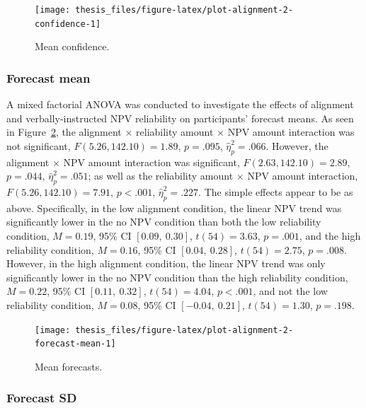 \documentclass[a4paper, nobind, dvipsnames]{templates/ociamthesis}
\theoremstyle{definition}
\theoremstyle{definition}
\theoremstyle{definition}
\theoremstyle{definition}
\theoremstyle{remark}
\begin{document}
\begin{figure}
\texttt{[image: thesis\_files/figure-latex/plot-alignment-2-confidence-1]} \caption{Mean confidence.}\label{fig:plot-alignment-2-confidence}
\end{figure}

\hypertarget{forecast-mean}{%
\subsubsection{Forecast mean}\label{forecast-mean}}

A mixed factorial ANOVA was conducted to investigate the effects of alignment
and verbally-instructed NPV reliability on participants' forecast means. As seen
in Figure~\ref{fig:plot-alignment-2-forecast-mean}, the alignment \(\times\)
reliability amount \(\times\) NPV amount interaction was not significant,
\(F(5.26, 142.10) = 1.89\), \(p = .095\), \(\hat{\eta}^2_p = .066\).
However, the alignment \(\times\) NPV amount interaction was significant,
\(F(2.63, 142.10) = 2.89\), \(p = .044\), \(\hat{\eta}^2_p = .051\); as well as the
reliability amount \(\times\) NPV amount interaction,
\(F(5.26, 142.10) = 7.91\), \(p < .001\), \(\hat{\eta}^2_p = .227\). The simple
effects appear to be as above. Specifically, in the low alignment condition, the
linear NPV trend was significantly lower in the no NPV condition than both the
low reliability condition,
\(M = 0.19\), 95\% CI \([0.09,~0.30]\), \(t(54) = 3.63\), \(p = .001\), and the high
reliability condition,
\(M = 0.16\), 95\% CI \([0.04,~0.28]\), \(t(54) = 2.75\), \(p = .008\). However, in the
high alignment condition, the linear NPV trend was only significantly lower in
the no NPV condition than the high reliability condition,
\(M = 0.22\), 95\% CI \([0.11,~0.32]\), \(t(54) = 4.04\), \(p < .001\), and not the low
reliability condition,
\(M = 0.08\), 95\% CI \([-0.04,~0.21]\), \(t(54) = 1.30\), \(p = .198\).



\begin{figure}
\texttt{[image: thesis\_files/figure-latex/plot-alignment-2-forecast-mean-1]} \caption{Mean forecasts.}\label{fig:plot-alignment-2-forecast-mean}
\end{figure}

\hypertarget{forecast-sd-alignment-2}{%
\subsubsection{Forecast SD}\label{forecast-sd-alignment-2}}
\end{document}
